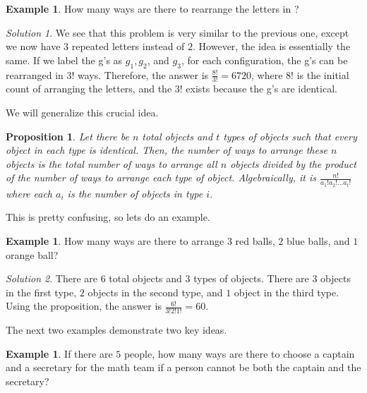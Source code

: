 \documentclass[l1pt]{article}
\theoremstyle{plain}
\newtheorem{prop}[thm]{Proposition}
\theoremstyle{definition}
\newtheorem{example}[thm]{Example}
\theoremstyle{remark}
\newtheorem*{solution}{Solution}
\begin{document}
\begin{example}
How many ways are there to rearrange the letters in ?
\end{example}

\begin{solution}
We see that this problem is very similar to the previous one, except we now have $3$ repeated letters instead of $2$. However, the idea is essentially the same. If we label the g's as $g_1, g_2$, and $g_3$, for each configuration, the g's can be rearranged in $3!$ ways. Therefore, the answer is $\frac{8!}{3!}=6720$, where $8!$ is the initial count of arranging the letters, and the $3!$ exists because the g's are identical.
\end{solution}


We will generalize this crucial idea.


\begin{mdframed}
\begin{prop}
Let there be $n$ total objects and $t$ types of objects such that every object in each type is identical. Then, the number of ways to arrange these $n$ objects is the total number of ways to arrange all $n$ objects divided by the product of the number of ways to arrange each type of object. Algebraically, it is $\frac{n!}{a_1! a_2! \dots a_t!}$ where each $a_i$ is the number of objects in type $i$. 
\end{prop}
\end{mdframed}

This is pretty confusing, so lets do an example.



\begin{example}
How many ways are there to arrange $3$ red balls, $2$ blue balls, and $1$ orange ball?
\end{example}

\begin{solution}
There are $6$ total objects and $3$ types of objects. There are $3$ objects in the first type, $2$ objects in the second type, and $1$ object in the third type. Using the proposition, the answer is $\frac{6!}{3!2!1!}=60$.
\end{solution}


The next two examples demonstrate two key ideas.


\begin{example}
If there are $5$ people, how many ways are there to choose a captain and a secretary for the math team if a person cannot be both the captain and the secretary?
\end{example}
\end{document}
